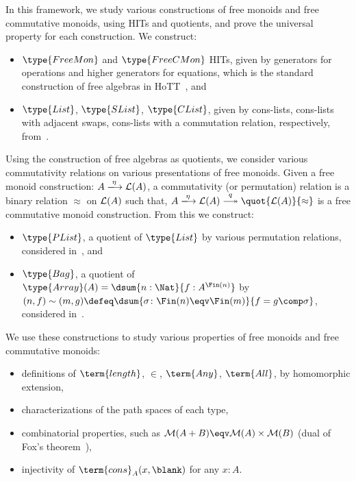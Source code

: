 \documentclass{article}
\begin{document}
In this framework, we study various constructions of free monoids and free commutative monoids, using HITs and
quotients, and prove the universal property for each construction.
%
We construct:
\begin{itemize}
    \item $\type{FreeMon}$ and $\type{FreeCMon}$ HITs,
          given by generators for operations and higher generators for equations, which is the standard construction of free
          algebras in HoTT~\cite{HoTTBook}, and
    \item $\type{List}$, $\type{SList}$, $\type{CList}$,
          given by cons-lists, cons-lists with adjacent swaps, cons-lists with a commutation relation, respectively,
          from~\cite*{Choudhury_2023,joram_et_al:LIPIcs.ITP.2023.20}.
\end{itemize}
%
Using the construction of free algebras as quotients,
we consider various commutativity relations on various presentations of free monoids.
%
Given a free monoid construction: $A \xto{\eta} \LL(A)$, a commutativity (or permutation) relation is a binary
relation $\approx$ on $\mathcal{L}(A)$ such that,
$A \xto{\eta} \LL(A) \epito{q} \quot{\LL(A)}{\approx}$ is a free commutative monoid construction.
%
From this we construct:
\begin{itemize}
    \item $\type{PList}$, a quotient of $\type{List}$ by various permutation relations,
          considered in~\cite*{10.1007/978-3-642-32347-8_11,joram_et_al:LIPIcs.ITP.2023.20}, and
    \item $\type{Bag}$, a quotient of $\type{Array}(A) = \dsum{n:\Nat}{f:A^{\Fin(n)}}$ by
          $(n,f) \sim (m,g) \defeq \dsum{\sigma \colon \Fin(n) \eqv \Fin(m)}{f = g \comp \sigma}$,
          considered in~\cite*{Choudhury_2023,joram_et_al:LIPIcs.ITP.2023.20}.
\end{itemize}
%
We use these constructions to study various properties of free monoids and free commutative monoids:
\begin{itemize}
    \item definitions of $\term{length}$, ${\in}$, $\term{Any}$, $\term{All}$,
          by homomorphic extension,
    \item characterizations of the path spaces of each type,
    \item combinatorial properties, such as $\MM(A + B) \eqv \MM(A) \times \MM(B)$
          (dual of Fox's theorem~\cite{doi:10.1080/00927877608822127}),
    \item injectivity of $\term{cons}_A(x, \blank)$ for any $x:A$.
\end{itemize}
\end{document}
